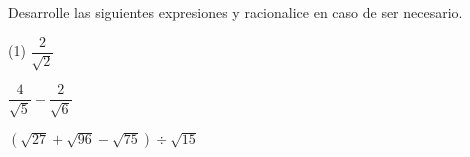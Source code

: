 \documentclass[]{srs}
\begin{document}
Desarrolle las siguientes expresiones y racionalice en caso de ser necesario.
\begin{preguntas}(1)
  \pregunta $\dfrac{2}{\sqrt{2}}$
  \begin{malla}[height=12cm]
  \end{malla}
  \pregunta $\dfrac{4}{\sqrt{5}}-\dfrac{2}{\sqrt{6}}$
  \begin{malla}[height=12cm]
  \end{malla}
  \pregunta $\left(\sqrt{27}+\sqrt{96}-\sqrt{75}\right)\div\sqrt{15}$
  \begin{malla}[height=12cm]
  \end{malla}
\end{preguntas}
\end{document}
